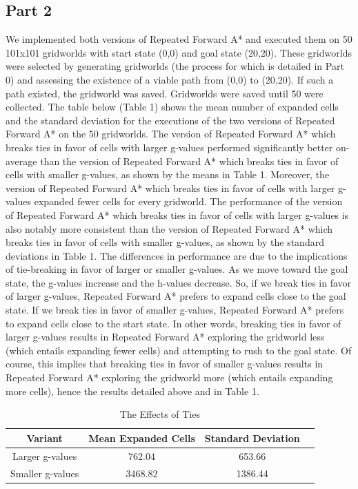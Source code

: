 \documentclass{article}
\begin{document}
\subsection*{Part 2}
We implemented both versions of Repeated Forward A* and executed them on 50 101x101 gridworlds with start state (0,0) and goal state (20,20). These gridworlds were selected by generating gridworlds (the process for which is detailed in Part 0) and assessing the existence of a viable path from (0,0) to (20,20). If such a path existed, the gridworld was saved. Gridworlds were saved until 50 were collected. The table below (Table 1) shows the mean number of expanded cells and the standard deviation for the executions of the two versions of Repeated Forward A* on the 50 gridworlds. The version of Repeated Forward A* which breaks ties in favor of cells with larger g-values performed significantly better on-average than the version of Repeated Forward A* which breaks ties in favor of cells with smaller g-values, as shown by the means in Table 1. Moreover, the version of Repeated Forward A* which breaks ties in favor of cells with larger g-values expanded fewer cells for every gridworld. The performance of the version of Repeated Forward A* which breaks ties in favor of cells with larger g-values is also notably more consistent than the version of Repeated Forward A* which breaks ties in favor of cells with smaller g-values, as shown by the standard deviations in Table 1. The differences in performance are due to the implications of tie-breaking in favor of larger or smaller g-values. As we move toward the goal state, the g-values increase and the h-values decrease. So, if we break ties in favor of larger g-values, Repeated Forward A* prefers to expand cells close to the goal state. If we break ties in favor of smaller g-values, Repeated Forward A* prefers to expand cells close to the start state. In other words, breaking ties in favor of larger g-values results in Repeated Forward A* exploring the gridworld less (which entails expanding fewer cells) and attempting to rush to the goal state. Of course, this implies that breaking ties in favor of smaller g-values results in Repeated Forward A* exploring the gridworld more (which entails expanding more cells), hence the results detailed above and in Table 1.\\ 

\begin{table}[!h]
    \centering
    \small
    \begin{tabular}{cccc}
        \hline
         Variant & Mean Expanded Cells & Standard Deviation\\
         \hline
         Larger g-values & 762.04 & 653.66\\
         Smaller g-values & 3468.82 & 1386.44\\
        \hline
    \end{tabular}
    \caption{The Effects of Ties}
    \label{tab:my_label}
\end{table}
\end{document}
